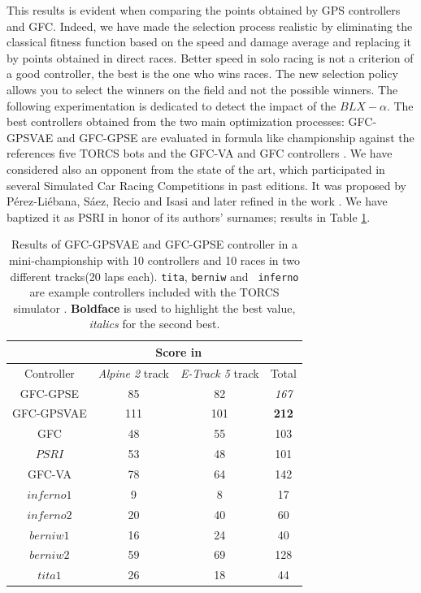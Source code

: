 \documentclass[10pt,journal,compsoc]{IEEEtran}
\begin{document}
This results is evident when comparing the points obtained by GPS controllers and GFC.
Indeed, we have made the selection process  realistic by eliminating
the classical fitness function based on the speed and damage average
and replacing it by points obtained in direct races. 
Better speed in solo racing is not a criterion of a good controller, the
best is the one who wins races. The new selection policy allows you to
select the winners on the field and not the possible winners. 
The following experimentation is dedicated to detect the impact of the $BLX-\alpha$.
The best controllers obtained from the two main optimization
processes: {\sf GFC-GPSVAE} and {\sf GFC-GPSE} are evaluated in formula like
championship against the references five TORCS bots and the {\sf GFC-VA}\cite{DBLP:conf/cig/SalemMG19}
and {\sf GFC} controllers  \cite{salem_cig2018}. We have considered also an opponent from the
state of the art, which participated in several Simulated Car Racing
Competitions in past editions.  %
It was proposed by P{\'e}rez-Li{\'e}bana, S{\'a}ez, Recio and Isasi
\cite{EvolvingRuleSystem08} and later refined in the work
\cite{PerezEvolvingFuzzy09}. We have baptized it as PSRI in honor of
its authors' surnames; results in Table \ref{tab:allsresults}.
%
\begin{table}[ht]
  \centering
  {\scriptsize
    \caption{ Results of {\sf GFC-GPSVAE} and {\sf GFC-GPSE}
      controller in a mini-championship with 10 controllers
      and 10 %
      races in two different tracks(20 laps each). {\tt tita}, {\tt berniw} and {\tt
        inferno} are example controllers included with the TORCS
      simulator \cite{torcs4}.  {\bf Boldface} is
      used to highlight the best value, {\em italics} for the second
      best.}
    {
      \begin{tabular}{|c|c|c||c|}
        \hline
        & \multicolumn{2}{|c|}{Score in} & \\
        \hline
        Controller&\textit{Alpine 2} track &\textit{E-Track 5} track &Total\\
        \hline
        \hline
{\sf GFC-GPSE}&	85&	82&	{\em 167}\\
{\sf GFC-GPSVAE}&111&101&            {\bf 212}\\
{\sf GFC}  \cite{salem_cig2018}&		48&	55&	103\\
$PSRI$\cite{PerezEvolvingFuzzy09}&		53&	48&	101\\
{\sf GFC-VA} \cite{DBLP:conf/cig/SalemMG19}&	78&	64&	142\\
$inferno1$&	9&	8&	17\\
$inferno2$&	20&	40&	60\\
$berniw1$&	16&	24&	40\\
$berniw2$&	59&	69&	128\\
$tita1$&	26&	18&	44\\
					\hline
				
			\end{tabular}
		}\label{tab:allsresults}
	}
\end{table}
%
\end{document}
